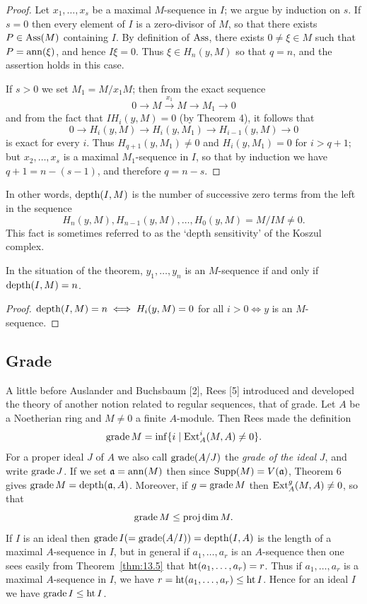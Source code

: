 \begin{proof}
Let $x_1, \ldots, x_s$ be a maximal $M$-sequence in $I$; we argue by induction
on $s$. If $s = 0$ then every element of $I$ is a zero-divisor of $M$, so that there
exists $P \in \operatorname{Ass}(M)$ containing $I$. By definition of $\operatorname{Ass}$, there exists $0 \neq \xi \in M$
such that $P = \operatorname{ann}(\xi)$, and hence $I\xi = 0$. Thus $\xi \in H_n(y, M)$ so that $q = n$,
and the assertion holds in this case.

If $s > 0$ we set $M_1 = M/x_1M$; then from the exact sequence
\[
  0 \to M \xrightarrow{x_1} M \to M_1 \to 0
\]
and from the fact that $IH_i(y, M) = 0$ (by Theorem 4), it follows that
\[
  0 \to H_i(y, M) \to H_i(y, M_1) \to H_{i-1}(y, M) \to 0
\]
is exact for every $i$. Thus $H_{q+1}(y, M_1) \neq 0$ and $H_i(y, M_1) = 0$ for $i > q + 1$;
but $x_2, \ldots, x_s$ is a maximal $M_1$-sequence in $I$, so that by induction we
have $q + 1 = n - (s - 1)$, and therefore $q = n - s$.
\end{proof}

In other words, $\operatorname{depth}(I, M)$ is the number of successive zero terms from
the left in the sequence
\[
  H_n(y, M), H_{n-1}(y, M), \ldots, H_0(y, M) = M/IM \neq 0.
\]
This fact is sometimes referred to as the `depth sensitivity' of the Koszul
complex.

\begin{corollary*}
In the situation of the theorem, $y_1, \ldots, y_n$ is an $M$-sequence if
and only if $\operatorname{depth} (I, M) = n$.
\end{corollary*}

\begin{proof}
$\operatorname{depth}(I, M) = n \iff H_i(y, M) = 0$ for all $i > 0 \iff y$ is an $M$-sequence.
\end{proof}

\subsection*{Grade}

A little before Auslander and Buchsbaum [2], Rees [5] introduced and
developed the theory of another notion related to regular sequences, that of
grade. Let $A$ be a Noetherian ring and $M \neq 0$ a finite $A$-module. Then Rees
made the definition
\[
  \operatorname{grade} M = \inf\{i \mid \operatorname{Ext}^i_A(M, A) \neq 0\}.
\]
For a proper ideal $J$ of $A$ we also call $\operatorname{grade} (A/J)$ the \emph{grade of the ideal}
$J$, and write $\operatorname{grade} J$. If we set $\mathfrak{a} = \operatorname{ann}(M)$ then since $\operatorname{Supp}(M) = V(\mathfrak{a})$,
Theorem 6 gives $\operatorname{grade} M = \operatorname{depth}(\mathfrak{a}, A)$. Moreover, if $g = \operatorname{grade} M$ then
$\operatorname{Ext}^g_A(M, A) \neq 0$, so that
\[
  \operatorname{grade} M \le \operatorname{proj\,dim} M.
\]
If $I$ is an ideal then $\operatorname{grade} I (=\operatorname{grade}(A/I)) = \operatorname{depth}(I, A)$ is the length
of a maximal $A$-sequence in $I$, but in general if $a_1, \ldots, a_r$ is an $A$-sequence
then one sees easily from Theorem~\ref{thm:13.5} that $\operatorname{ht}(a_1, \ldots, a_r) = r$. Thus if
$a_1, \ldots, a_r$ is a maximal $A$-sequence in $I$, we have $r = \operatorname{ht}(a_1, \ldots, a_r) \le \operatorname{ht} I$.
Hence for an ideal $I$ we have $\operatorname{grade} I \le \operatorname{ht} I$.

